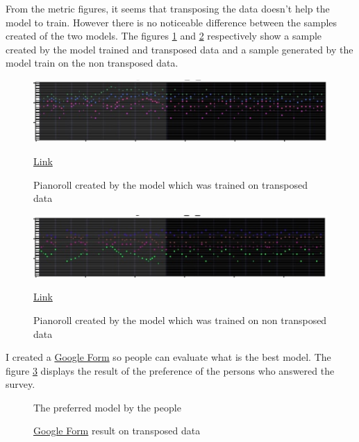\documentclass[12pt]{report}
\begin{document}
From the metric figures, it seems that transposing the data doesn't help the model to train.
However there is no noticeable difference between the samples created of the two models.
The figures \ref{fig:exp:tranpose:with} and \ref{fig:exp:tranpose:without} respectively show a sample created by the model trained and transposed data and a sample generated by the model train on the non transposed data.

\begin{figure}[htbp]
    \centering
    \includegraphics[width=\textwidth]{images/experiences/transpose-rnn/generated-with-transpose.jpg}
    \caption{Pianoroll created by the model which was trained on transposed data}
    \href{https://github.com/ValentinVignal/midiGenerator/blob/master/samples/transpose-comparison/generated-with-transpose.mid}{Link}
    \label{fig:exp:tranpose:with}
\end{figure}

\begin{figure}[htbp]
    \centering
    \includegraphics[width=\textwidth]{images/experiences/transpose-rnn/generated-without-transpose.jpg}
    \caption{Pianoroll created by the model which was trained on non transposed data}
    \href{https://github.com/ValentinVignal/midiGenerator/blob/master/samples/transpose-comparison/generated-without-transpose.mid}{Link}
    \label{fig:exp:tranpose:without}
\end{figure}


I created a \href{https://docs.google.com/forms/d/e/1FAIpQLSe3LEiDZFI9Y58OgWvHwKke4k1_2yPg8eJLQFBasSKUAdh3Ng/viewform?usp=sf_link}{Google Form} so people can evaluate what is the best model.
The figure \ref{fig:pie:transpose} displays the result of the preference of the persons who answered the survey.

\begin{figure}
    \begin{center}
    \caption{\href{https://docs.google.com/forms/d/e/1FAIpQLSe3LEiDZFI9Y58OgWvHwKke4k1_2yPg8eJLQFBasSKUAdh3Ng/viewform?usp=sf_link}{Google Form} result on transposed data}
    The preferred model by the people
    \label{fig:pie:transpose}
    \end{center}
\end{figure}
\end{document}
